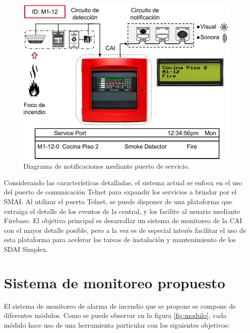 \begin{figure}[ht]
   \centering
   \includegraphics[scale=.45]{./Figures/telnet.jpg}
   \caption{Diagrama de notificaciones mediante puerto de servicio.}
   \label{fig:telnet}
\end{figure}


Considerando las características detalladas, el sistema actual se enfoca en el uso del puerto de comunicación Telnet para expandir los servicios a brindar por el SMAI. Al utilizar el puerto Telnet, se puede disponer de una plataforma que extraiga el detalle de los eventos de la central, y los facilite al usuario mediante Firebase. El objetivo principal es desarrollar un sistema de monitoreo de la CAI con el mayor detalle posible, pero a la vez es de especial interés facilitar el uso de esta plataforma para acelerar las tareas de instalación y mantenimiento de los SDAI Simplex.


\section{Sistema de monitoreo propuesto}

El sistema de monitoreo de alarma de incendio que se propone se compone de diferentes módulos. Como se puede observar en la figura \ref{fig:modulo}, cada módulo hace uso de una herramienta particular con los siguientes objetivos:

